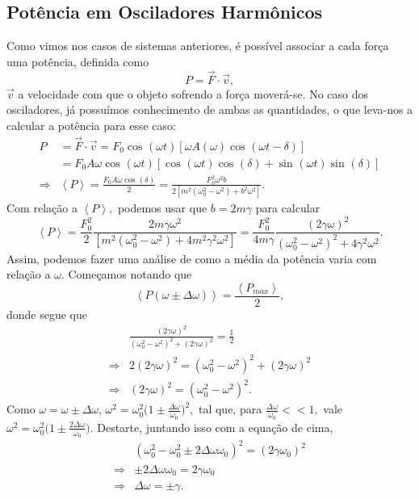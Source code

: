 \documentclass{article}
\begin{document}
\subsection{Potência em Osciladores Harmônicos}
Como vimos nos casos de sistemas anteriores, é possível associar a cada força uma potência, definida como 
\[
  P = \vec{F}\cdot \vec{v},
\]
\(\vec{v}\) a velocidade com que o objeto sofrendo a força moverá-se. No caso dos osciladores, já possuímos conhecimento
de ambas as quantidades, o que leva-nos a calcular a potência para esse caso:
\begin{align*}
  P &= \vec{F}\cdot \vec{v} = F_{0}\cos^{}{(\omega t)}[\omega A(\omega )\cos^{}{(\omega t-\delta )}]\\
    &=F_{0}A\omega \cos^{}{(\omega t)}[\cos^{}{(\omega t)}\cos^{}{(\delta )} + \sin^{}{(\omega t)}\sin^{}{(\delta )}]\\
  \Rightarrow & \left< P\right> = \frac{F_{0}A\omega \cos^{}{(\delta )}}{2} = \frac{F_{0}^{2}\omega^{2}b}{2[m^{2}(\omega_{0}^{2}-\omega^{2})+b^{2}\omega^{2}]}.
\end{align*}
Com relação a \(\left< P \right>,\) podemos usar que \(b = 2m\gamma \) para calcular 
\[
  \left< P \right> = \frac{F_{0}^{2}}{2}\frac{2m\gamma \omega^{2}}{[m^{2}(\omega_{0}^{2}-\omega^{2}) + 4m^{2}\gamma^{2}\omega^{2}]} = \frac{F_{0}^{2}}{4m\gamma }\frac{(2\gamma \omega )^{2}}{(\omega_{0}^{2}-\omega ^{2})^{2}+4\gamma^{2}\omega^{2}}.
\]
Assim, podemos fazer uma análise de como a média da potência varia com relação a \(\omega \). Começamos notando que 
\[
  \left< P(\omega \pm \Delta \omega ) \right> = \frac{\left< P_{max} \right>}{2},
\]
donde segue que 
\begin{align*}
  &\frac{(2\gamma \omega )^{2}}{(\omega_{0}^{2}-\omega ^{2})^{2}+(2\gamma \omega )^{2}} = \frac{1}{2}\\
  \Rightarrow &2(2\gamma \omega )^{2} = (\omega_{0}^{2}-\omega ^{2})^{2}+(2\gamma \omega )^{2}\\
  \Rightarrow &(2\gamma \omega )^{2}=(\omega_{0}^{2}-\omega ^{2})^{2}.
\end{align*}
Como \(\omega = \omega \pm \Delta \omega \), \(\omega^{2} = \omega_{0}^{2}\biggl(1\pm \frac{\Delta \omega }{\omega_{0}}\biggr)^{2},\) tal que, para \(\frac{\Delta \omega }{\omega_{0}} <<1,\)
vale \(\omega ^{2} = \omega_{0}^{2}\biggl(1 \pm \frac{2\Delta \omega }{\omega_{0}}\biggr).\) Destarte, juntando isso com a equação de cima,
\begin{align*}
   &(\omega_{0}^{2}-\omega_{0}^{2}\pm 2\Delta \omega \omega_{0})^{2} = (2\gamma \omega_{0})^{2}\\
  \Rightarrow &\pm 2\Delta \omega \omega_{0} = 2\gamma \omega_{0}\\
  \Rightarrow &\Delta \omega = \pm\gamma .
\end{align*}
\end{document}
